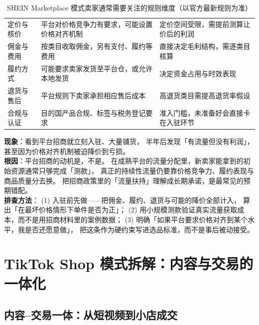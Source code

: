 \begin{table}[htbp]
\centering
\caption{SHEIN Marketplace 模式卖家通常需要关注的规则维度（以官方最新规则为准）}
\label{tab:shein-marketplace}
\small
\begin{tabularx}{\textwidth}{L{2.6cm} L{4.8cm} Y}
\toprule
{} &  &  \\
\midrule
定价与核价 & 平台对价格竞争力有要求，可能设置价格对齐机制 & 定价空间受限，需提前测算让价后的利润 \\
\addlinespace
佣金与费用 & 按类目收取佣金，另有支付、履约等费用 & 直接决定毛利结构，需逐类目核算 \\
\addlinespace
履约方式 & 可能要求卖家发货至平台仓，或允许本地发货 & 决定资金占用与时效表现 \\
\addlinespace
退货与售后 & 平台规则下卖家承担相应售后成本 & 高退货类目需提高退货率假设 \\
\addlinespace
合规与认证 & 目的国产品合规、标签与税务登记要求 & 准入门槛，未准备好会直接卡在入驻环节 \\
\bottomrule
\end{tabularx}
\end{table}

\begin{pitfall}
\textbf{现象}：看到平台招商就立刻入驻、大量铺货，
半年后发现「有流量但没有利润」，甚至因为价格对齐机制被迫降价到亏损。\\
\textbf{根因}：平台招商的动机是，不是。
在成熟平台的流量分配里，新卖家能拿到的初始资源通常只够完成「测款」，
真正的持续性流量仍要靠价格竞争力、履约表现与商品质量分去换。
把招商政策里的「流量扶持」理解成长期承诺，是最常见的预期错配。\\
\textbf{排查方法}：
(1) 入驻前先做——把佣金、履约、退货与可能的降价全部计入，
算出「在最坏价格情形下单件是否为正」；
(2) 用小规模测款验证真实流量获取成本，而不是用招商材料里的案例数据；
(3) 明确「如果平台要求价格对齐到某个水平，我是否还愿意做」，
把这条作为硬约束写进选品标准，而不是事后被动接受。
\end{pitfall}

\section{TikTok Shop 模式拆解：内容与交易的一体化}
\label{sec:plat-tiktok}

\subsection{内容--交易一体：从短视频到小店成交}

